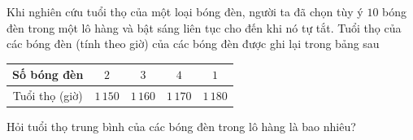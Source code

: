 \begin{vd}%
	Khi nghiên cứu tuổi thọ của một loại bóng đèn, người ta đã chọn tùy ý $10$ bóng đèn trong một lô hàng và bật sáng liên tục cho đến khi nó tự tắt. Tuổi thọ của các bóng đèn (tính theo giờ) của các bóng đèn được ghi lại trong bảng sau
	\begin{center}
		\begin{tabular}{|c|c|c|c|c|}
			\hline
			Số bóng đèn & $2$ & $3$ & $4$ & $1$\\
			\hline
			Tuổi thọ (giờ) & $1\,150$ & $1\,160$ & $1\,170$ & $1\,180$\\
			\hline
		\end{tabular}
	\end{center}
	Hỏi tuổi thọ trung bình của các bóng đèn trong lô hàng là bao nhiêu?
\end{vd}


